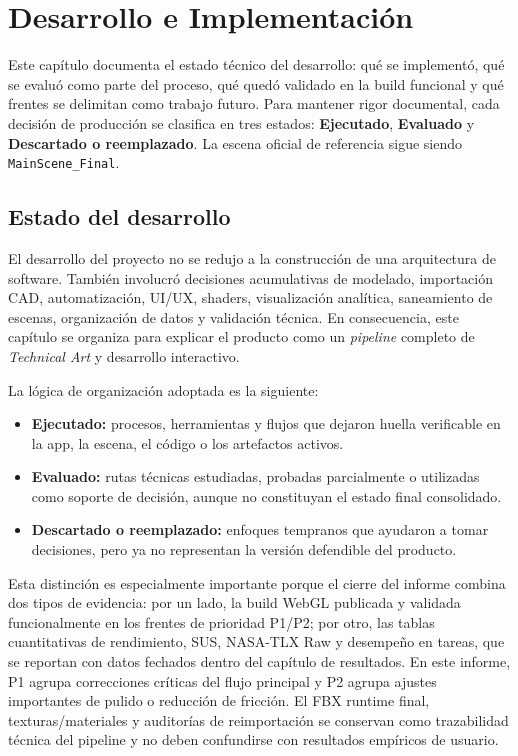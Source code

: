 ﻿\section{Desarrollo e Implementación}

Este capítulo documenta el estado técnico del desarrollo: qué se implementó, qué se evaluó como parte del proceso, qué quedó validado en la build funcional y qué frentes se delimitan como trabajo futuro. Para mantener rigor documental, cada decisión de producción se clasifica en tres estados: \textbf{Ejecutado}, \textbf{Evaluado} y \textbf{Descartado o reemplazado}. La escena oficial de referencia sigue siendo \texttt{MainScene\_Final}.

\subsection{Estado del desarrollo}

El desarrollo del proyecto no se redujo a la construcción de una arquitectura de software. También involucró decisiones acumulativas de modelado, importación CAD, automatización, UI/UX, shaders, visualización analítica, saneamiento de escenas, organización de datos y validación técnica. En consecuencia, este capítulo se organiza para explicar el producto como un \textit{pipeline} completo de \textit{Technical Art} y desarrollo interactivo.

La lógica de organización adoptada es la siguiente:
\begin{itemize}
    \item \textbf{Ejecutado:} procesos, herramientas y flujos que dejaron huella verificable en la app, la escena, el código o los artefactos activos.
    \item \textbf{Evaluado:} rutas técnicas estudiadas, probadas parcialmente o utilizadas como soporte de decisión, aunque no constituyan el estado final consolidado.
    \item \textbf{Descartado o reemplazado:} enfoques tempranos que ayudaron a tomar decisiones, pero ya no representan la versión defendible del producto.
\end{itemize}

Esta distinción es especialmente importante porque el cierre del informe combina dos tipos de evidencia: por un lado, la build WebGL publicada y validada funcionalmente en los frentes de prioridad P1/P2; por otro, las tablas cuantitativas de rendimiento, SUS, NASA-TLX Raw y desempeño en tareas, que se reportan con datos fechados dentro del capítulo de resultados. En este informe, P1 agrupa correcciones críticas del flujo principal y P2 agrupa ajustes importantes de pulido o reducción de fricción. El FBX runtime final, texturas/materiales y auditorías de reimportación se conservan como trazabilidad técnica del pipeline y no deben confundirse con resultados empíricos de usuario.

